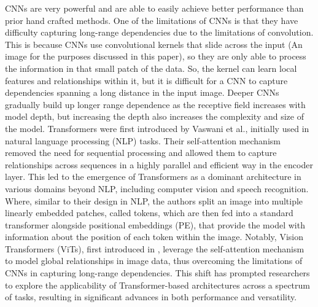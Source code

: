 \documentclass[11pt]{ociamthesis}  %
\begin{document}
CNNs are very powerful and are able to easily achieve better performance than prior hand crafted methods. One of the limitations of CNNs is that they have difficulty capturing long-range dependencies due to the limitations of convolution. This is because CNNs use convolutional kernels that slide across the input (An image for the purposes discussed in this paper), so they are only able to process the information in that small patch of the data. So, the kernel can learn local features and relationships within it, but it is difficult for a CNN to capture dependencies spanning a long distance in the input image. Deeper CNNs gradually build up longer range dependence as the receptive field increases with model depth, but increasing the depth also increases the complexity and size of the model. Transformers were first introduced by Vaswani et al.\cite{vaswani2017attention}, initially used in natural language processing (NLP) tasks. Their self-attention mechanism removed the need for sequential processing and allowed them to capture relationships across sequences in a highly parallel and efficient way in the encoder layer. This led to the emergence of Transformers as a dominant architecture in various domains beyond NLP, including computer vision and speech recognition. Where, similar to their design in NLP, the authors split an image into multiple linearly embedded patches, called tokens, which are then fed into a standard transformer alongside positional embeddings (PE), that provide the model with information about the position of each token within the image. Notably, Vision Transformers (ViTs), first introduced in \cite{dosovitskiy2020image}, leverage the self-attention mechanism to model global relationships in image data, thus overcoming the limitations of CNNs in capturing long-range dependencies. This shift has prompted researchers to explore the applicability of Transformer-based architectures across a spectrum of tasks, resulting in significant advances in both performance and versatility.
\end{document}
